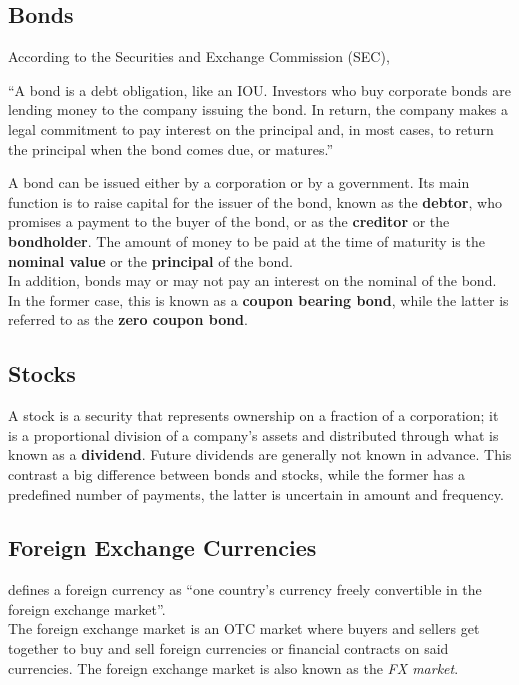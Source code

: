 \documentclass[../TGMAFFIRO]{subfiles}
\begin{document}
\subsection{Bonds}

According to the Securities and Exchange Commission (SEC),
\begin{displayquote}
``A bond is a debt obligation, like an IOU. Investors who buy corporate bonds are lending money to the company issuing the bond. In return, the company makes a legal commitment to pay interest on the principal and, in most cases, to return the principal when the bond comes due, or matures.''
\end{displayquote}

A bond can be issued either by a corporation or by a government. Its main function is to raise capital for the issuer of the bond, known as the \textbf{debtor}, who promises a payment to the buyer of the bond, or as the \textbf{creditor} or the \textbf{bondholder}. The amount of money to be paid at the time of maturity is the \textbf{nominal value} or the \textbf{principal} of the bond.\\

In addition, bonds may or may not pay an interest on the nominal of the bond. In the former case, this is known as a \textbf{coupon bearing bond}, while the latter is referred to as the \textbf{zero coupon bond}.

\subsection{Stocks}
A stock is a security that represents ownership on a fraction of a corporation; it is a proportional division of a company's assets and distributed through what is known as a \textbf{dividend}. Future dividends are generally not known in advance. This contrast a big difference between bonds and stocks, while the former has a predefined number of payments, the latter is uncertain in amount and frequency.

\subsection{Foreign Exchange Currencies}
 defines a foreign currency as ``one country's currency freely convertible in the foreign exchange market''.\\

The foreign exchange market is an OTC market where buyers and sellers get together to buy and sell foreign currencies or financial contracts on said currencies. The foreign exchange market is also known as the \textit{FX market}.
\end{document}
